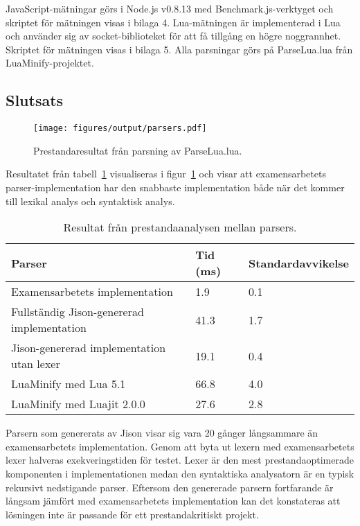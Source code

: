JavaScript-mätningar görs i Node.js v0.8.13 med Benchmark.js-verktyget och
skriptet för mätningen visas i bilaga 4. Lua-mätningen är implementerad i Lua
och använder sig av socket-biblioteket för att få tillgång en högre
noggrannhet. Skriptet för mätningen visas i bilaga 5. Alla parsningar görs på
ParseLua.lua från LuaMinify-projektet.

\subsection{Slutsats}

\begin{figure}[ht]
  \texttt{[image: figures/output/parsers.pdf]}
  \caption{Prestandaresultat från parsning av ParseLua.lua.}
  \label{fig:parserresult}
\end{figure}

Resultatet från tabell~\ref{tab:parsers} visualiseras i
figur~\ref{fig:parserresult} och visar att examensarbetets
parser-implementation har den snabbaste implementation både när det kommer
till lexikal analys och syntaktisk analys.

\begin{table}[ht]
  \caption{Resultat från prestandaanalysen mellan parsers.}
  \begin{tabular}{l l l}
    Parser & Tid (ms) & Standardavvikelse \\
    \hline
    Examensarbetets implementation & 1.9 & 0.1 \\
    Fullständig Jison-genererad implementation & 41.3 & 1.7 \\
    Jison-genererad implementation utan lexer & 19.1 & 0.4 \\
    LuaMinify med Lua 5.1 & 66.8 & 4.0 \\
    LuaMinify med Luajit 2.0.0 & 27.6 & 2.8
  \end{tabular}
  \label{tab:parsers}
\end{table}


Parsern som genererats av Jison visar sig vara 20 gånger långsammare än
examensarbetets implementation.  Genom att byta ut lexern med examensarbetets
lexer halveras exekveringstiden för testet. Lexer är den mest
prestandaoptimerade komponenten i implementationen medan den syntaktiska
analysatorn är en typisk rekursivt nedstigande parser. Eftersom den
genererade parsern fortfarande är långsam jämfört med examensarbetets
implementation kan det konstateras att lösningen inte är passande för ett
prestandakritiskt projekt.

